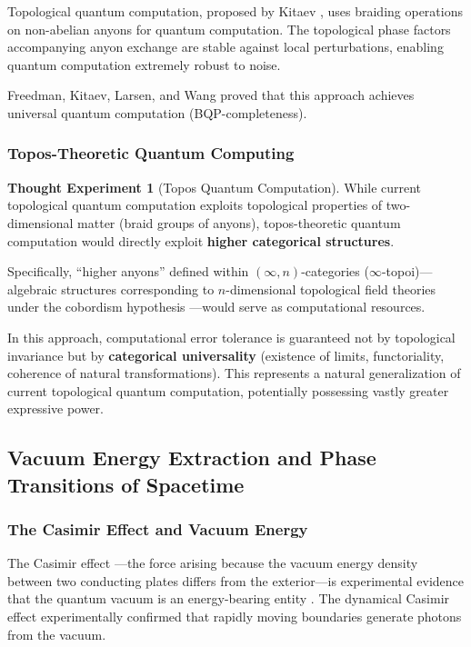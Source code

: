 \documentclass[12pt,a4paper]{article}
\theoremstyle{definition}
\newtheorem{thought}[definition]{Thought Experiment}
\begin{document}
Topological quantum computation, proposed by Kitaev \cite{Kitaev2003}, uses braiding operations on non-abelian anyons for quantum computation. The topological phase factors accompanying anyon exchange are stable against local perturbations, enabling quantum computation extremely robust to noise.

Freedman, Kitaev, Larsen, and Wang \cite{FreemanKitaevLarsenWang2003} proved that this approach achieves universal quantum computation (BQP-completeness).

\subsubsection{Topos-Theoretic Quantum Computing}

\begin{thought}[Topos Quantum Computation]
While current topological quantum computation exploits topological properties of two-dimensional matter (braid groups of anyons), topos-theoretic quantum computation would directly exploit \textbf{higher categorical structures}.

Specifically, ``higher anyons'' defined within $(\infty,n)$-categories \cite{Lurie2009} ($\infty$-topoi)---algebraic structures corresponding to $n$-dimensional topological field theories under the cobordism hypothesis \cite{BaezDolan1995, Lurie2009Hopkins}---would serve as computational resources.

In this approach, computational error tolerance is guaranteed not by topological invariance but by \textbf{categorical universality} (existence of limits, functoriality, coherence of natural transformations). This represents a natural generalization of current topological quantum computation, potentially possessing vastly greater expressive power.
\end{thought}

\subsection{Vacuum Energy Extraction and Phase Transitions of Spacetime}

\subsubsection{The Casimir Effect and Vacuum Energy}

The Casimir effect \cite{Casimir1948}---the force arising because the vacuum energy density between two conducting plates differs from the exterior---is experimental evidence that the quantum vacuum is an energy-bearing entity \cite{Lamoreaux1997}. The dynamical Casimir effect \cite{Wilson2011} experimentally confirmed that rapidly moving boundaries generate photons from the vacuum.
\end{document}
